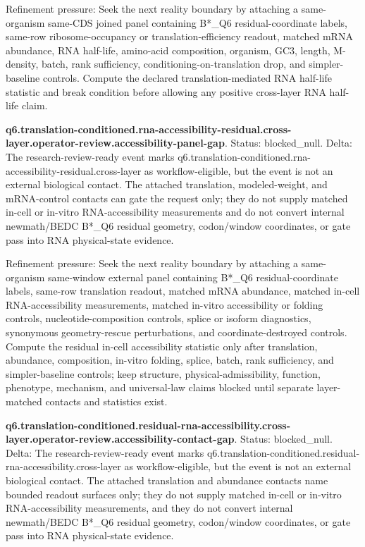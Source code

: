 Refinement pressure: Seek the next reality boundary by attaching a same-organism same-CDS joined panel containing B*\_Q6 residual-coordinate labels, same-row ribosome-occupancy or translation-efficiency readout, matched mRNA abundance, RNA half-life, amino-acid composition, organism, GC3, length, M-density, batch, rank sufficiency, conditioning-on-translation drop, and simpler-baseline controls. Compute the declared translation-mediated RNA half-life statistic and break condition before allowing any positive cross-layer RNA half-life claim.

\textbf{q6.translation-conditioned.rna-accessibility-residual.cross-layer.operator-review.accessibility-panel-gap}. Status: blocked\_null. Delta: The research-review-ready event marks q6.translation-conditioned.rna-accessibility-residual.cross-layer as workflow-eligible, but the event is not an external biological contact. The attached translation, modeled-weight, and mRNA-control contacts can gate the request only; they do not supply matched in-cell or in-vitro RNA-accessibility measurements and do not convert internal newmath/BEDC B*\_Q6 residual geometry, codon/window coordinates, or gate pass into RNA physical-state evidence.

Refinement pressure: Seek the next reality boundary by attaching a same-organism same-window external panel containing B*\_Q6 residual-coordinate labels, same-row translation readout, matched mRNA abundance, matched in-cell RNA-accessibility measurements, matched in-vitro accessibility or folding controls, nucleotide-composition controls, splice or isoform diagnostics, synonymous geometry-rescue perturbations, and coordinate-destroyed controls. Compute the residual in-cell accessibility statistic only after translation, abundance, composition, in-vitro folding, splice, batch, rank sufficiency, and simpler-baseline controls; keep structure, physical-admissibility, function, phenotype, mechanism, and universal-law claims blocked until separate layer-matched contacts and statistics exist.

\textbf{q6.translation-conditioned.residual-rna-accessibility.cross-layer.operator-review.accessibility-contact-gap}. Status: blocked\_null. Delta: The research-review-ready event marks q6.translation-conditioned.residual-rna-accessibility.cross-layer as workflow-eligible, but the event is not an external biological contact. The attached translation and abundance contacts name bounded readout surfaces only; they do not supply matched in-cell or in-vitro RNA-accessibility measurements, and they do not convert internal newmath/BEDC B*\_Q6 residual geometry, codon/window coordinates, or gate pass into RNA physical-state evidence.

